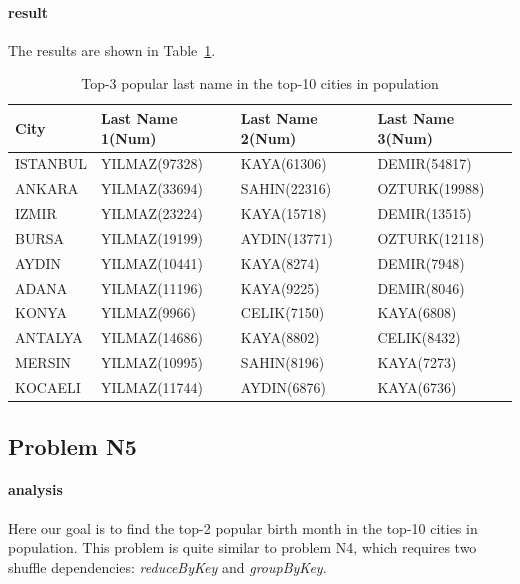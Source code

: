 \documentclass{article}
\begin{document}
\paragraph{result}
The results are shown in Table~\ref{table-1}.
\begin{table}[ht]
\centering
\caption{ Top-3 popular last name in the top-10 cities in population}
\label{table-1}
\begin{tabular}{llll}
\toprule
City & Last Name 1(Num) &  Last Name 2(Num) &  Last Name 3(Num) \\
\midrule
ISTANBUL & YILMAZ(97328) & KAYA(61306) & DEMIR(54817) \\
ANKARA & YILMAZ(33694) & SAHIN(22316) & OZTURK(19988) \\
IZMIR & YILMAZ(23224) & KAYA(15718) & DEMIR(13515) \\
BURSA & YILMAZ(19199) & AYDIN(13771) & OZTURK(12118) \\
AYDIN & YILMAZ(10441) & KAYA(8274) & DEMIR(7948) \\
ADANA & YILMAZ(11196) & KAYA(9225) & DEMIR(8046) \\
KONYA & YILMAZ(9966) & CELIK(7150) & KAYA(6808) \\
ANTALYA & YILMAZ(14686) & KAYA(8802) & CELIK(8432) \\
MERSIN & YILMAZ(10995) & SAHIN(8196) & KAYA(7273) \\
KOCAELI & YILMAZ(11744) & AYDIN(6876) & KAYA(6736) \\
\bottomrule
\end{tabular}
\end{table}


\subsection{Problem N5}
\paragraph{analysis}
Here our goal is to find the top-2 popular birth month in the top-10 cities in population. This problem is quite similar to problem N4, which requires two shuffle dependencies: \emph{reduceByKey} and \emph{groupByKey}.
\end{document}
